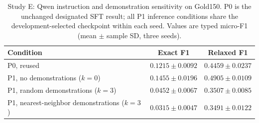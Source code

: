 \begin{table}[htbp]
\caption{Study E: Qwen instruction and demonstration sensitivity on Gold150. P0 is the unchanged designated SFT result; all P1 inference conditions share the development-selected checkpoint within each seed. Values are typed micro-F1 (mean $\pm$ sample SD, three seeds).}
\label{tab:appendix-e-p1}
\centering
\small
\begin{tabularx}{\linewidth}{@{}Lcc@{}}
\toprule
Condition & Exact F1 & Relaxed F1 \\
\midrule
P0, reused & $0.1215\pm0.0092$ & $0.4459\pm0.0237$ \\
P1, no demonstrations ($k=0$) & $0.1455\pm0.0196$ & $0.4905\pm0.0109$ \\
P1, random demonstrations ($k=3$) & $0.0452\pm0.0067$ & $0.3507\pm0.0085$ \\
P1, nearest-neighbor demonstrations ($k=3$) & $0.0315\pm0.0047$ & $0.3491\pm0.0122$ \\
\bottomrule
\end{tabularx}
\end{table}
